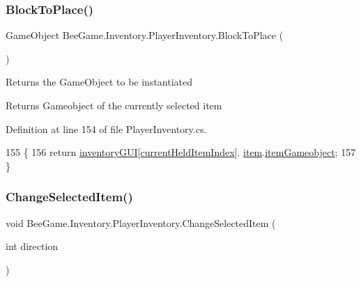 \subsubsection{\texorpdfstring{Block\+To\+Place()}{BlockToPlace()}}
{\footnotesize\ttfamily Game\+Object Bee\+Game.\+Inventory.\+Player\+Inventory.\+Block\+To\+Place (\begin{DoxyParamCaption}{ }\end{DoxyParamCaption})}



Returns the Game\+Object to be instantiated 

\begin{DoxyReturn}{Returns}
Gameobject of the currently selected item
\end{DoxyReturn}


Definition at line 154 of file Player\+Inventory.\+cs.


\begin{DoxyCode}
155         \{
156             \textcolor{keywordflow}{return} \hyperlink{class_bee_game_1_1_inventory_1_1_inventory_base_a48dcba7ad7bfa1bed8c9ae290fb32857}{inventoryGUI}[\hyperlink{class_bee_game_1_1_inventory_1_1_player_inventory_ac2978979c5c8e45fccc7d3a10882ea1b}{currentHeldItemIndex}].
      \hyperlink{class_bee_game_1_1_inventory_1_1_inventory_slot_a31b201e7eef9ed0001a447b3f76a7a81}{item}.\hyperlink{struct_bee_game_1_1_items_1_1_item_af28a8cd4a0eff9d4c18189c5ab525f18}{itemGameobject};
157         \}
\end{DoxyCode}
\mbox{\label{class_bee_game_1_1_inventory_1_1_player_inventory_a95bef0a0a994161176a5034fb9bc3444}} 
\subsubsection{\texorpdfstring{Change\+Selected\+Item()}{ChangeSelectedItem()}}
{\footnotesize\ttfamily void Bee\+Game.\+Inventory.\+Player\+Inventory.\+Change\+Selected\+Item (\begin{DoxyParamCaption}\item[{int}]{direction }\end{DoxyParamCaption})\hspace{0.3cm}{\ttfamily [private]}}



